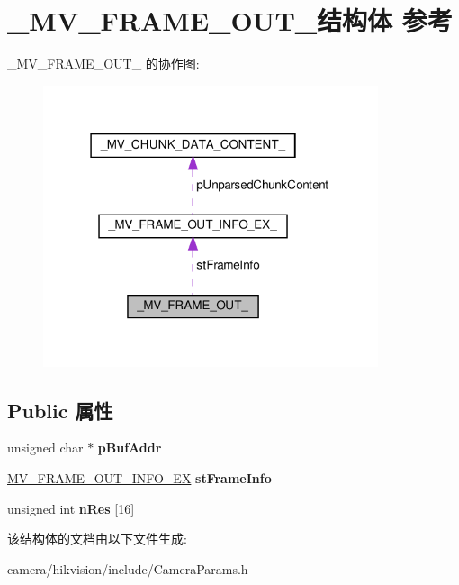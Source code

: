 \hypertarget{struct___m_v___f_r_a_m_e___o_u_t__}{}\section{\+\_\+\+M\+V\+\_\+\+F\+R\+A\+M\+E\+\_\+\+O\+U\+T\+\_\+结构体 参考}
\label{struct___m_v___f_r_a_m_e___o_u_t__}


\+\_\+\+M\+V\+\_\+\+F\+R\+A\+M\+E\+\_\+\+O\+U\+T\+\_\+ 的协作图\+:\nopagebreak
\begin{figure}[H]
\begin{center}
\leavevmode
\includegraphics[width=279pt]{struct___m_v___f_r_a_m_e___o_u_t____coll__graph}
\end{center}
\end{figure}
\subsection*{Public 属性}
\begin{DoxyCompactItemize}
\item 
\mbox{\label{struct___m_v___f_r_a_m_e___o_u_t___a5fa8908538e3adf0a0040d35edea9e0f}} 
unsigned char $\ast$ {\bfseries p\+Buf\+Addr}
\item 
\mbox{\label{struct___m_v___f_r_a_m_e___o_u_t___ac733bc81d580fe0746b25f70341e450e}} 
\hyperlink{struct___m_v___f_r_a_m_e___o_u_t___i_n_f_o___e_x__}{M\+V\+\_\+\+F\+R\+A\+M\+E\+\_\+\+O\+U\+T\+\_\+\+I\+N\+F\+O\+\_\+\+EX} {\bfseries st\+Frame\+Info}
\item 
\mbox{\label{struct___m_v___f_r_a_m_e___o_u_t___ad976e77511ba4c4aa8708285507a6c18}} 
unsigned int {\bfseries n\+Res} \mbox{[}16\mbox{]}
\end{DoxyCompactItemize}


该结构体的文档由以下文件生成\+:\begin{DoxyCompactItemize}
\item 
camera/hikvision/include/Camera\+Params.\+h\end{DoxyCompactItemize}
